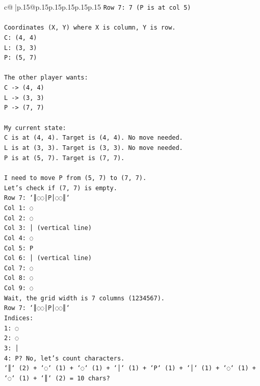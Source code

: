 \documentclass{article}
\begin{document}
{\begin{supertabular}{c@{$\;$}|p{.15\linewidth}@{}p{.15\linewidth}p{.15\linewidth}p{.15\linewidth}p{.15\linewidth}p{.15\linewidth}}
{{{\texttt{Row 7: 7 (P is at col 5)} \\
\\ 
\texttt{Coordinates (X, Y) where X is column, Y is row.} \\
\texttt{C: (4, 4)} \\
\texttt{L: (3, 3)} \\
\texttt{P: (5, 7)} \\
\\ 
\texttt{The other player wants:} \\
\texttt{C {-}> (4, 4)} \\
\texttt{L {-}> (3, 3)} \\
\texttt{P {-}> (7, 7)} \\
\\ 
\texttt{My current state:} \\
\texttt{C is at (4, 4). Target is (4, 4). No move needed.} \\
\texttt{L is at (3, 3). Target is (3, 3). No move needed.} \\
\texttt{P is at (5, 7). Target is (7, 7).} \\
\\ 
\texttt{I need to move P from (5, 7) to (7, 7).} \\
\texttt{Let's check if (7, 7) is empty.} \\
\texttt{Row 7: `║◌◌│P│◌◌║`} \\
\texttt{Col 1: ◌} \\
\texttt{Col 2: ◌} \\
\texttt{Col 3: │ (vertical line)} \\
\texttt{Col 4: ◌} \\
\texttt{Col 5: P} \\
\texttt{Col 6: │ (vertical line)} \\
\texttt{Col 7: ◌} \\
\texttt{Col 8: ◌} \\
\texttt{Col 9: ◌} \\
\texttt{Wait, the grid width is 7 columns (1234567).} \\
\texttt{Row 7: `║◌◌│P│◌◌║`} \\
\texttt{Indices:} \\
\texttt{1: ◌} \\
\texttt{2: ◌} \\
\texttt{3: │} \\
\texttt{4: P? No, let's count characters.} \\
\texttt{`║` (2) + `◌` (1) + `◌` (1) + `│` (1) + `P` (1) + `│` (1) + `◌` (1) + `◌` (1) + `║` (2) = 10 chars?} \\
}}}
\end{supertabular}}
\end{document}
